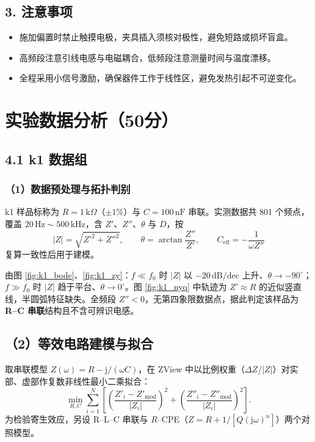 \documentclass[12pt,a4paper]{ctexart}
\begin{document}
\subsection*{3. 注意事项}
\begin{itemize}
    \item 施加偏置时禁止触摸电极，夹具插入须核对极性，避免短路或损坏盲盒。
    \item 高频段注意引线电感与电磁耦合，低频段注意测量时间与温度漂移。
    \item 全程采用小信号激励，确保器件工作于线性区，避免发热引起不可逆变化。
\end{itemize}

\section*{实验数据分析（50分）}

\subsection*{4.1 k1 数据组}

\subsubsection*{（1）数据预处理与拓扑判别}
k1 样品标称为 $R=1\,\mathrm{k}\Omega$（$\pm1\%$）与 $C=100\,\mathrm{nF}$ 串联。实测数据共 801 个频点，覆盖 $20\,\mathrm{Hz}\sim500\,\mathrm{kHz}$，含 $Z'$、$Z''$、$\theta$ 与 $D$，按
\begin{equation}
    |Z|=\sqrt{Z'^2+Z''^2},\qquad \theta=\arctan\frac{Z''}{Z'},\qquad C_{\mathrm{eff}}=-\frac{1}{\omega Z''}
\end{equation}
复算一致性后用于建模。

由图 \ref{fig:k1_bode}、\ref{fig:k1_zy}：$f\ll f_0$ 时 $|Z|$ 以 $-20\,\mathrm{dB/dec}$ 上升、$\theta\to-90^\circ$；$f\gg f_0$ 时 $|Z|$ 趋于平台、$\theta\to0^\circ$。图 \ref{fig:k1_nyq} 中轨迹为 $Z'\approx R$ 的近似竖直线，半圆弧特征缺失。全频段 $Z''<0$，无第四象限数据点，据此判定该样品为 \textbf{R--C 串联}结构且不含可辨识电感。

\subsection*{（2）等效电路建模与拟合}
取串联模型 $Z(\omega)=R-\mathrm{j}/(\omega C)$，在 ZView 中以比例权重（$\Delta Z/|Z|$）对实部、虚部作复数非线性最小二乘拟合：
\begin{equation}
    \min_{R,C}\sum_{i=1}^{N}\left[\left(\frac{Z'_i-Z'_{\mathrm{mod}}}{|Z_i|}\right)^2+\left(\frac{Z''_i-Z''_{\mathrm{mod}}}{|Z_i|}\right)^2\right].
\end{equation}
为检验寄生效应，另设 R--L--C 串联与 $R$--CPE（$Z=R+1/[Q(\mathrm{j}\omega)^n]$）两个对照模型。
\end{document}
